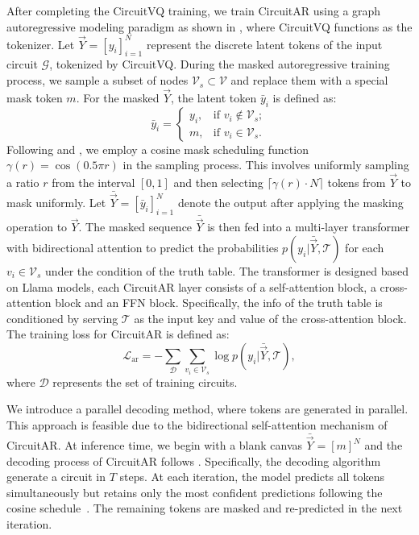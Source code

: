 After completing the CircuitVQ training, we train CircuitAR using a graph autoregressive modeling paradigm as shown in , where CircuitVQ functions as the tokenizer. 
Let $\vec{Y} = [y_i]_{i=1}^N$ represent the discrete latent tokens of the input circuit $\mathcal{G}$, tokenized by CircuitVQ. 
During the masked autoregressive training process, we sample a subset of nodes $\mathcal{V}_{s} \subset \mathcal{V}$ and replace them with a special mask token $\mathit{m}$. 
For the masked $\vec{Y}$, the latent token $\bar{y}_i$ is defined as:
\begin{equation}
\bar{y}_i = \begin{cases} 
    y_i, & \text{if } v_{i} \notin \mathcal{V}_{s}; \\
    \mathit{m}, & \text{if } v_{i} \in \mathcal{V}_{s}.
      \end{cases}
\end{equation}
Following \citet{chang2022maskgit} and \citet{li2024mar}, we employ a cosine mask scheduling function $\gamma(r) = \cos(0.5\pi r)$ in the sampling process. 
This involves uniformly sampling a ratio $r$ from the interval $[0, 1]$ and then selecting $\lceil \gamma(r) \cdot N \rceil$ tokens from $\vec{Y}$ to mask uniformly. 
Let $\bar{\vec{Y}} = [\bar{y}_i]_{i=1}^N$ denote the output after applying the masking operation to $\vec{Y}$. 
The masked sequence $\bar{\vec{Y}}$ is then fed into a multi-layer transformer with bidirectional attention to predict the probabilities $p(y_i | \bar{\vec{Y}}, \mathcal{T})$ for each $v_{i} \in \mathcal{V}_{s}$ under the condition of the truth table. 
The transformer is designed based on Llama models, each CircuitAR layer consists of a self-attention block, a cross-attention block and an FFN block.
Specifically, the info of the truth table is conditioned by serving $\mathcal{T}$ as the input key and value of the cross-attention block.
The training loss for CircuitAR is defined as:
\begin{equation}
	\mathcal{L}_\text{ar} = -\sum\limits_{\mathcal{D}} \sum\limits_{v_{i} \in \mathcal{V}_{s}} 
	\log p(y_i | \bar{\vec{Y}}, \mathcal{T}),
\end{equation}
where $\mathcal{D}$ represents the set of training circuits.

We introduce a parallel decoding method, where tokens are generated in parallel. 
This approach is feasible due to the bidirectional self-attention mechanism of CircuitAR. 
At inference time, we begin with a blank canvas $\bar{\vec{Y}} = [\mathit{m}]^N$ and the decoding process of CircuitAR follows . 
Specifically, the decoding algorithm generate a circuit in $T$ steps. 
At each iteration, the model predicts all tokens simultaneously but retains only the most confident predictions following the cosine schedule~\cite{chang2022maskgit, li2024mar}. 
The remaining tokens are masked and re-predicted in the next iteration. 

